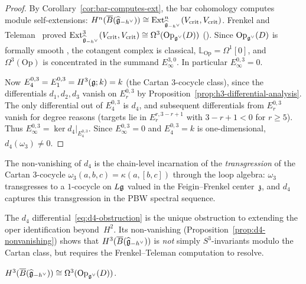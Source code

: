 \begin{proof}
By Corollary~\ref{cor:bar-computes-ext}, the bar cohomology
computes module self-extensions:
$H^n(\overline{B}(\widehat{\mathfrak{g}}_{-h^\vee})) \cong
\mathrm{Ext}^n_{\widehat{\mathfrak{g}}_{-h^\vee}}(V_{\mathrm{crit}},
V_{\mathrm{crit}})$.
Frenkel and Teleman~\cite{FT06} proved
$\mathrm{Ext}^3_{\widehat{\mathfrak{g}}_{-h^\vee}}(V_{\mathrm{crit}},
V_{\mathrm{crit}}) \cong \Omega^3(\mathrm{Op}_{\mathfrak{g}^\vee}(D))$
(\ClaimStatusProvedElsewhere).
Since $\mathrm{Op}_{\mathfrak{g}^\vee}(D)$ is formally smooth
\cite{FG06}, the cotangent complex is classical,
$\mathbb{L}_{\mathrm{Op}} = \Omega^1[0]$, and
$\Omega^3(\mathrm{Op})$ is concentrated in the summand
$E_\infty^{3,0}$.  In particular
$E_\infty^{0,3} = 0$.

Now $E_4^{0,3} = E_1^{0,3} = H^3(\mathfrak{g}; k) = k$ (the Cartan
$3$-cocycle class), since the differentials $d_1, d_2, d_3$
vanish on $E_r^{0,3}$ by
Proposition~\ref{prop:h3-differential-analysis}.  The only
differential out of $E_4^{0,3}$ is $d_4$, and subsequent
differentials from $E_r^{0,3}$ vanish for degree reasons
(targets lie in $E_r^{r, 3-r+1}$ with $3 - r + 1 < 0$ for
$r \geq 5$).  Thus $E_\infty^{0,3} = \ker d_4|_{E_4^{0,3}}$.
Since $E_\infty^{0,3} = 0$ and $E_4^{0,3} = k$ is one-dimensional,
$d_4(\omega_3) \neq 0$.
\end{proof}

\begin{remark}
\label{rem:d4-transgression}
The non-vanishing of $d_4$ is the chain-level incarnation of the
\emph{transgression} of the Cartan $3$-cocycle
$\omega_3(a,b,c) = \kappa(a,[b,c])$ through the loop algebra:
$\omega_3$ transgresses to a $1$-cocycle on $L\mathfrak{g}$ valued in the
Feigin--Frenkel center~$\mathfrak{z}$, and $d_4$ captures this
transgression in the PBW spectral sequence.
\end{remark}

\begin{remark}[H3 obstruction]\label{rem:h3-obstruction}
The $d_4$ differential~\eqref{eq:d4-obstruction} is the unique
obstruction to extending the oper identification beyond~$H^2$.
Its non-vanishing (Proposition~\ref{prop:d4-nonvanishing}) shows
that $H^3(\overline{B}(\widehat{\mathfrak{g}}_{-h^\vee}))$ is \emph{not} simply
$S^3$-invariants modulo the Cartan class, but requires the
Frenkel--Teleman computation to resolve.
\end{remark}

\begin{corollary}
\label{cor:h3-oper}
$H^3(\overline{B}(\widehat{\mathfrak{g}}_{-h^\vee})) \cong
\Omega^3(\mathrm{Op}_{\mathfrak{g}^\vee}(D))$.
\end{corollary}

